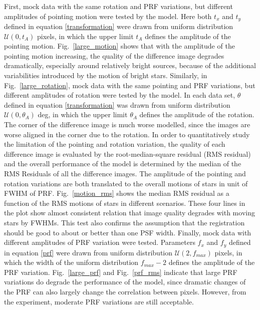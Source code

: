 \documentclass[12pt, preprint]{aastex}
\begin{document}
First, mock data with the same rotation and PRF variations, but different amplitudes of pointing motion were tested by the model.
Here both $t_x$ and $t_y$ defined in equation \ref{transformation} were drawn from uniform distribution ${\mathcal {U}}(0,t_A)$ pixels, in which the upper limit $t_A$ defines the amplitude of the pointing motion.
Fig.~\ref{large_motion} shows that with the amplitude of the pointing motion increasing,  the quality of the difference image degrades dramatically, especially around relatively bright sources, because of the additional variabilities introduced by the motion of bright stars.
Similarly, in Fig.~\ref{large_rotation}, mock data with the same pointing and PRF variations, but different amplitudes of rotation were tested by the model.
In each data set, $\theta$ defined in equation \ref{transformation} was drawn from uniform distribution ${\mathcal {U}}(0,\theta_A)$ deg, in which the upper limit $\theta_A$ defines the amplitude of the rotation.
The corner of the difference image is much worse modelled, since the images are worse aligned in the corner due to the rotation. 
In order to quantitatively study the limitation of the pointing and rotation variation, the quality of each difference image is evaluated by the root-median-square residual (RMS residual) and the overall performance of the model is determined by the median of the RMS Residuals of all the difference images.
The amplitude of the pointing and rotation variations are both translated to the overall motions of stars in unit of FWHM of PRF.
Fig.~\ref{motion_rms} shows the median RMS residual as a function of the RMS motions of stars in different scenarios. 
These four lines in the plot show almost consistent relation that image quality degrades with moving stars by FWHMs.
This test also confirms the assumption that the registration should be good to about or better than one PSF width.
Finally, mock data with different amplitudes of PRF variation were tested.
Parameters $f_x$ and $f_y$ defined in equation \ref{prf} were drawn from uniform distribution ${\mathcal {U}}(2,f_{max})$ pixels, in which the width of the uniform distribution $f_{max}-2$ defines the amplitude of the PRF variation.
Fig.~\ref{large_prf} and Fig.~\ref{prf_rms} indicate that large PRF variations do degrade the performance of the model, since dramatic changes of the PRF can also largely change the correlation between pixels.
However, from the experiment, moderate PRF variations are still acceptable. 
\end{document}
